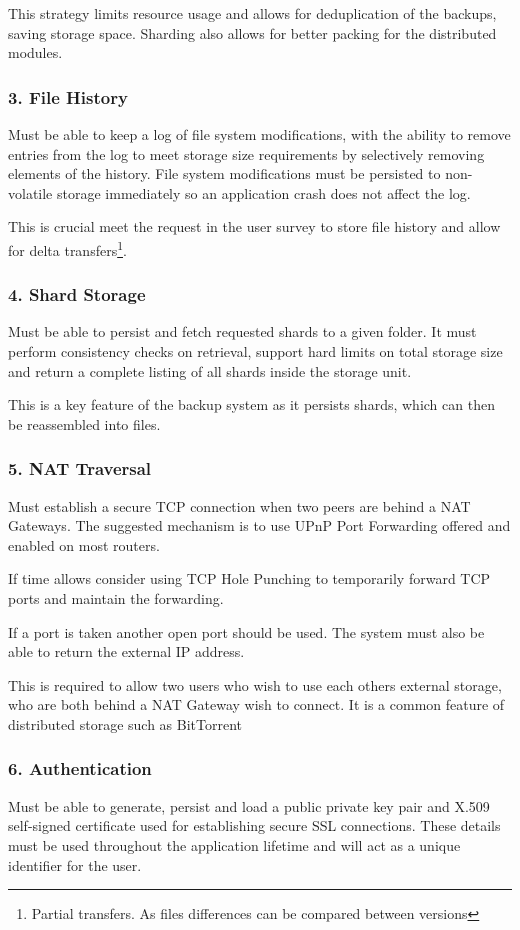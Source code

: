 \documentclass[11pt, a4paper, twoside]{report}
\begin{document}
This strategy limits resource usage and allows for deduplication of the backups, saving storage space. Sharding also allows for better packing for the distributed modules.

\subsubsection{3. File History}
Must be able to keep a log of file system modifications, with the ability to remove entries from the log to meet storage size requirements by selectively removing elements of the history. File system modifications must be persisted to non-volatile storage immediately so an application crash does not affect the log.

This is crucial meet the request in the user survey to store file history and allow for delta transfers\footnote{Partial transfers. As files differences can be compared between versions}.

\subsubsection{4. Shard Storage}
Must be able to persist and fetch requested shards to a given folder. It must perform consistency checks on retrieval, support hard limits on total storage size and return a complete listing of all shards inside the storage unit.

This is a key feature of the backup system as it persists shards, which can then be reassembled into files.

\subsubsection{5. NAT Traversal}
Must establish a secure TCP connection when two peers are behind a NAT Gateways. The suggested mechanism is to use UPnP Port Forwarding offered and enabled on most routers.

If time allows consider using TCP Hole Punching to temporarily forward TCP ports and maintain the forwarding.

If a port is taken another open port should be used. The system must also be able to return the external IP address.

This is required to allow two users who wish to use each others external storage, who are both behind a NAT Gateway wish to connect. It is a common feature of distributed storage such as BitTorrent

\subsubsection{6. Authentication}
Must be able to generate, persist and load a public private key pair and X.509 self-signed certificate used for establishing secure SSL connections. These details must be used throughout the application lifetime and will act as a unique identifier for the user.
\end{document}
